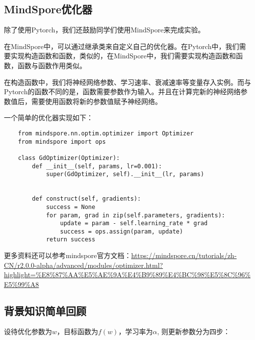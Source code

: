\subsection{MindSpore优化器}

除了使用Pytorch，我们还鼓励同学们使用MindSpore来完成实验。

在MindSpore中，可以通过继承类来自定义自己的优化器。在Pytorch中，我们需要实现构造函数和函数，类似的，在MindSpore中，我们需要实现构造函数和函数，函数与函数作用类似。

在构造函数中，我们将神经网络参数、学习速率、衰减速率等变量存入实例。而与Pytorch的函数不同的是，函数需要参数作为输入。并且在计算完新的神经网络参数值后，需要使用函数将新的参数值赋予神经网络。

一个简单的优化器实现如下：
\begin{lstlisting}
    from mindspore.nn.optim.optimizer import Optimizer
    from mindspore import ops

    class GdOptimizer(Optimizer):
        def __init__(self, params, lr=0.001):
            super(GdOptimizer, self).__init__(lr, params)

        
        def construct(self, gradients):
            success = None
            for param, grad in zip(self.parameters, gradients):
                update = param - self.learning_rate * grad
                success = ops.assign(param, update)
            return success
\end{lstlisting}

更多资料还可以参考mindspore官方文档：\url{https://mindspore.cn/tutorials/zh-CN/r2.0.0-alpha/advanced/modules/optimizer.html?highlight=%E8%87%AA%E5%AE%9A%E4%B9%89%E4%BC%98%E5%8C%96%E5%99%A8}

\subsection{背景知识简单回顾}
设待优化参数为$w$，目标函数为$f(w)$，学习率为$\alpha$, 则更新参数分为四步：

